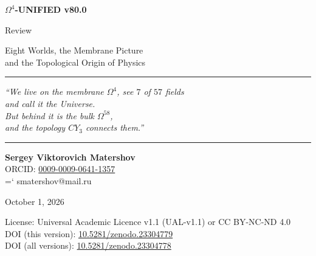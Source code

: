 \documentclass[11pt,a4paper]{article}
\newcommand{\CY}{CY_3}
\newcommand{\Om}{\Omega^4}
\newcommand{\Omfi}{\Omega^{58}}
\renewcommand{\texttt}[1]{{\ttfamily\hyphenchar\font=`\- #1}}
\theoremstyle{definition}
\begin{document}
\begin{center}
{\Huge\bfseries $\Om$-UNIFIED v80.0}

\vspace{0.5cm}

{\Large Review}

\vspace{0.3cm}

{\large Eight Worlds, the Membrane Picture \\
and the Topological Origin of Physics}

\vspace{1.5cm}

\rule{0.6\textwidth}{0.4pt}

\vspace{1cm}

{\large\itshape
``We live on the membrane $\Om$, see $7$ of $57$ fields \\
and call it the Universe. \\
But behind it is the bulk $\Omfi$, \\
and the topology $\CY$ connects them.''
}

\vspace{1cm}

\rule{0.6\textwidth}{0.4pt}

\vspace{1.5cm}

{\large
\textbf{Sergey Viktorovich Matershov} \\[0.3em]
ORCID: \href{https://orcid.org/0009-0009-0641-1357}{0009-0009-0641-1357} \\[0.3em]
\texttt{smatershov@mail.ru}
}

\vspace{1.5cm}

{\large
October 1, 2026
}

\vspace{1cm}

{\small
License: Universal Academic Licence v1.1 (UAL-v1.1) or CC BY-NC-ND 4.0 \\[0.2em]
DOI (this version): \href{https://doi.org/10.5281/zenodo.23304779}{10.5281/zenodo.23304779} \\[0.2em]
DOI (all versions): \href{https://doi.org/10.5281/zenodo.23304778}{10.5281/zenodo.23304778}
\par}

\end{center}

\vfill

\end{document}
